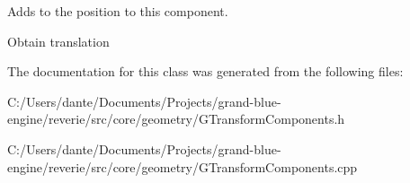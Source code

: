Adds to the position to this component. 

Obtain translation 

The documentation for this class was generated from the following files\+:\begin{DoxyCompactItemize}
\item 
C\+:/\+Users/dante/\+Documents/\+Projects/grand-\/blue-\/engine/reverie/src/core/geometry/G\+Transform\+Components.\+h\item 
C\+:/\+Users/dante/\+Documents/\+Projects/grand-\/blue-\/engine/reverie/src/core/geometry/G\+Transform\+Components.\+cpp\end{DoxyCompactItemize}
